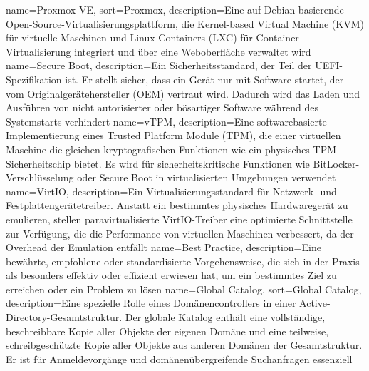 {
	name={Prox\-mox VE},
	sort={Proxmox},
	description={Eine auf De\-bi\-an ba\-sie\-ren\-de Open-Source-Vir\-tu\-a\-li\-sie\-rungs\-platt\-form, die Ker\-nel-ba\-sed Vir\-tu\-al Ma\-chine (KVM) für vir\-tu\-el\-le Ma\-schi\-nen und Li\-nux Con\-tai\-ners (LXC) für Con\-tai\-ner-Vir\-tu\-a\-li\-sie\-rung in\-te\-griert und über eine Web\-ober\-flä\-che ver\-wal\-tet wird}
}
{
	name={Se\-cure Boot},
	description={Ein Si\-cher\-heits\-stan\-dard, der Teil der UEFI-Spe\-zi\-fi\-ka\-ti\-on ist. Er stellt si\-cher, dass ein Ge\-rät nur mit Soft\-ware star\-tet, der vom Ori\-gi\-nal\-ge\-rä\-te\-her\-stel\-ler (OEM) ver\-traut wird. Da\-durch wird das La\-den und Aus\-füh\-ren von nicht au\-to\-ri\-sier\-ter oder bös\-ar\-ti\-ger Soft\-ware wäh\-rend des Sys\-tem\-starts ver\-hin\-dert}
}
{
	name={vTPM},
	description={Eine soft\-ware\-ba\-sier\-te Im\-ple\-men\-tie\-rung ei\-nes Trus\-ted Plat\-form Mo\-du\-le (TPM), die ei\-ner vir\-tu\-el\-len Ma\-schi\-ne die glei\-chen kryp\-to\-gra\-fi\-schen Funk\-tio\-nen wie ein phy\-si\-sches TPM-Si\-cher\-heits\-chip bie\-tet. Es wird für si\-cher\-heits\-kri\-ti\-sche Funk\-tio\-nen wie Bit\-Lo\-cker-Ver\-schlüs\-se\-lung oder Se\-cure Boot in vir\-tu\-a\-li\-sier\-ten Um\-ge\-bun\-gen ver\-wen\-det}
}
{
	name={VirtIO},
	description={Ein Vir\-tu\-a\-li\-sie\-rungs\-stan\-dard für Netz\-werk- und Fest\-plat\-ten\-ge\-rä\-te\-trei\-ber. An\-statt ein be\-stimm\-tes phy\-si\-sches Hard\-ware\-ge\-rät zu emu\-lie\-ren, stel\-len pa\-ra\-vir\-tu\-a\-li\-sier\-te VirtIO-Trei\-ber eine op\-ti\-mier\-te Schnitt\-stel\-le zur Ver\-fü\-gung, die die Per\-for\-mance von vir\-tu\-el\-len Ma\-schi\-nen ver\-bes\-sert, da der Over\-head der Emu\-la\-ti\-on ent\-fällt}
}
{
	name={Best Prac\-tice},
	description={Eine be\-währ\-te, emp\-foh\-le\-ne oder stan\-dar\-di\-sier\-te Vor\-ge\-hens\-wei\-se, die sich in der Pra\-xis als be\-son\-ders ef\-fek\-tiv oder ef\-fi\-zi\-ent er\-wie\-sen hat, um ein be\-stimm\-tes Ziel zu er\-rei\-chen oder ein Pro\-blem zu lö\-sen}
}
{
	name={Glo\-bal Ca\-ta\-log},
	sort={Global Catalog},
	description={Eine spe\-zi\-el\-le Rol\-le ei\-nes Do\-mä\-nen\-con\-trol\-lers in ei\-ner Ac\-tive-Di\-rec\-to\-ry-Ge\-samt\-struk\-tur. Der glo\-ba\-le Ka\-ta\-log ent\-hält eine voll\-stän\-di\-ge, be\-schreib\-ba\-re Ko\-pie al\-ler Ob\-jek\-te der ei\-ge\-nen Do\-mä\-ne und eine teil\-wei\-se, schreib\-ge\-schütz\-te Ko\-pie al\-ler Ob\-jek\-te aus an\-de\-ren Do\-mä\-nen der Ge\-samt\-struk\-tur. Er ist für An\-mel\-de\-vor\-gän\-ge und do\-mä\-nen\-über\-grei\-fen\-de Such\-an\-fra\-gen es\-sen\-zi\-ell}
}
